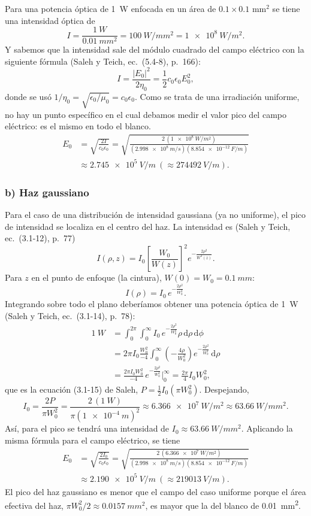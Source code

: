 \documentclass{article}
\newcommand{\dd}{\,\mathrm{d}}
\begin{document}
Para una potencia óptica de \SI{1}{W} enfocada en un área de $0.1\times0.1$ mm$^2$ se tiene una
intensidad óptica de
\[
I=\frac{\SI{1}{W}}{\SI{0.01}{mm^2}}=\SI{100}{W/mm^2}=\SI{1e8}{W/m^2}.
\]
Y sabemos que la intensidad sale del módulo cuadrado del campo eléctrico con la siguiente fórmula
(Saleh y Teich, ec.~(5.4-8), p.~166):
\[
I=\frac{|E_0|^2}{2\eta_0}=\frac12c_0\epsilon_0E_0^2 ,
\]
donde se usó $1/\eta_0=\sqrt{\epsilon_0/\mu_0}=c_0\epsilon_0$. Como se trata de una irradiación
uniforme, no hay un punto específico en el cual debamos medir el valor pico del campo eléctrico: es el
mismo en todo el blanco.
\begin{align*}
E_0&=\sqrt{\frac{2I}{c_0\epsilon_0}}=\sqrt{\frac{2\,(\SI{1e8}{W/m^2})}{(\SI{2.998e8}{m/s})(\SI{8.854e-12}{F/m})}}\\
&\approx\boxed{\SI{2.745e5}{V/m}}\ (\approx\SI{274492}{V/m}).
\end{align*}

\subsubsection*{b) Haz gaussiano}

Para el caso de una distribución de intensidad gaussiana (ya no uniforme), el pico de intensidad se
localiza en el centro del haz. La intensidad es (Saleh y Teich, ec.~(3.1-12), p.~77)
\[
I(\rho,z)=I_0\left[\frac{W_0}{W(z)}\right]^2e^{-\frac{2\rho^2}{W^2(z)}}.
\]
Para $z$ en el punto de enfoque (la cintura), $W(0)=W_0=\SI{0.1}{mm}$:
\[
I(\rho)=I_0\,e^{-\frac{2\rho^2}{W_0^2}}.
\]
Integrando sobre todo el plano deberíamos obtener una potencia óptica de \SI{1}{W}
(Saleh y Teich, ec.~(3.1-14), p.~78):
\begin{align*}
\SI{1}{W}&=\int_0^{2\pi}\!\!\int_0^{\infty}I_0\,e^{-\frac{2\rho^2}{W_0^2}}\rho\dd\rho\dd\phi\\
&=2\pi I_0\frac{W_0^2}{-4}\int_0^{\infty}\left(-\frac{4\rho}{W_0^2}\right)e^{-\frac{2\rho^2}{W_0^2}}\dd\rho\\
&=\frac{2\pi I_0W_0^2}{-4}\,e^{-\frac{2\rho^2}{W_0^2}}\bigg|_0^{\infty}
=\frac{2\pi}{4}I_0W_0^2 ,
\end{align*}
que es la ecuación (3.1-15) de Saleh, $P=\tfrac12I_0(\pi W_0^2)$. Despejando,
\[
I_0=\frac{2P}{\pi W_0^2}=\frac{2\,(\SI{1}{W})}{\pi(\SI{1e-4}{m})^2}\approx\SI{6.366e7}{W/m^2}\approx\SI{63.66}{W/mm^2}.
\]
Así, para el pico se tendrá una intensidad de $I_0\approx\SI{63.66}{W/mm^2}$. Aplicando la misma fórmula
para el campo eléctrico, se tiene
\begin{align*}
E_0&=\sqrt{\frac{2I_0}{c_0\epsilon_0}}=\sqrt{\frac{2\,(\SI{6.366e7}{W/m^2})}{(\SI{2.998e8}{m/s})(\SI{8.854e-12}{F/m})}}\\
&\approx\boxed{\SI{2.190e5}{V/m}}\ (\approx\SI{219013}{V/m}).
\end{align*}
El pico del haz gaussiano es menor que el campo del caso uniforme porque el área efectiva del haz,
$\pi W_0^2/2\approx\SI{0.0157}{mm^2}$, es mayor que la del blanco de \SI{0.01}{mm^2}.
\end{document}
